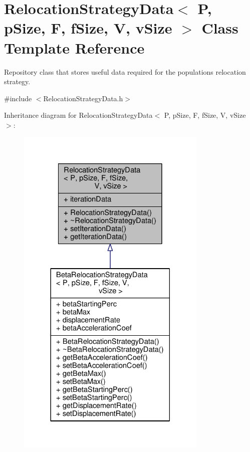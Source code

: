 \hypertarget{structRelocationStrategyData}{}\section{Relocation\+Strategy\+Data$<$ P, p\+Size, F, f\+Size, V, v\+Size $>$ Class Template Reference}
\label{structRelocationStrategyData}


Repository class that stores useful data required for the population\textquotesingle{}s relocation strategy.  




{\ttfamily \#include $<$Relocation\+Strategy\+Data.\+h$>$}



Inheritance diagram for Relocation\+Strategy\+Data$<$ P, p\+Size, F, f\+Size, V, v\+Size $>$\+:\nopagebreak
\begin{figure}[H]
\begin{center}
\leavevmode
\includegraphics[width=258pt]{structRelocationStrategyData__inherit__graph}
\end{center}
\end{figure}



